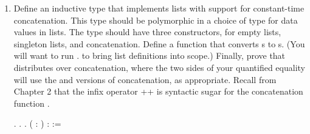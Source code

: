 \documentclass[12pt]{report}
\begin{document}
\begin{enumerate}
\begin{coqdoccode}
\coqdocindent{1.00em}
;  , ; . .\coqdoceol
\coqdocnoindent
{}  : \coqdockw{\ensuremath{\forall}} (   : ),  (  )    (  ) (  ).\coqdoceol
\coqdocindent{1.00em}
;  , , ; . .\coqdoceol
\coqdocemptyline
\coqdocnoindent
{} .\coqdoceol
\coqdocemptyline
\end{coqdoccode}
\item Define an inductive type  that implements lists with support for constant-time concatenation.  This type should be polymorphic in a choice of type for data values in lists.  The type  should have three constructors, for empty lists, singleton lists, and concatenation.  Define a function  that converts s to s.  (You will want to run   . to bring list definitions into scope.)  Finally, prove that  distributes over concatenation, where the two sides of your quantified equality will use the  and  versions of concatenation, as appropriate.  Recall from Chapter 2 that the infix operator ++ is syntactic sugar for the  concatenation function .
 \begin{coqdoccode}
\coqdocemptyline
\coqdocnoindent
{} .\coqdoceol
\coqdocnoindent
{}  .\coqdoceol
\coqdocnoindent
{}.\coqdoceol
\coqdocnoindent
{}  ( : ) : :=\coqdoceol

\end{coqdoccode}
\end{enumerate}
\end{document}
